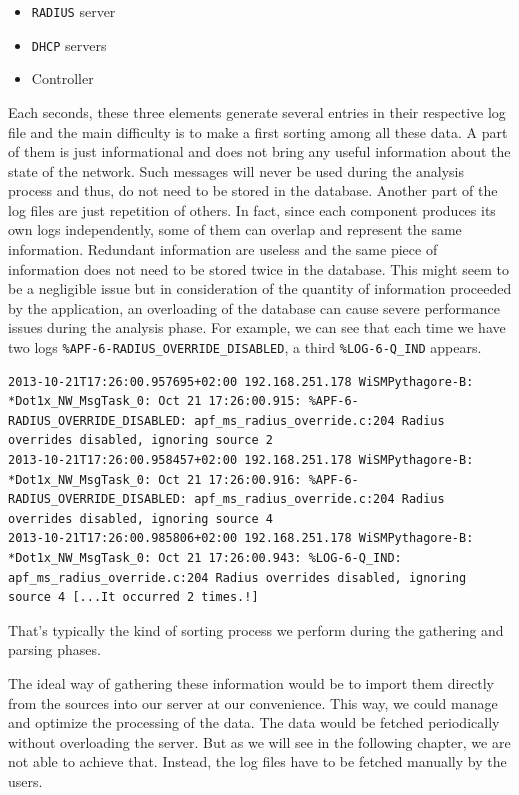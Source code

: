 \begin{itemize}
  \item \texttt{RADIUS} server
  \item \texttt{DHCP} servers
  \item Controller
\end{itemize}

Each seconds, these three elements generate several entries in their respective log file and the main difficulty is to make a first sorting among all these data. A part of them is just informational and does not bring any useful information about the state of the network. Such messages will never be used during the analysis process and thus, do not need to be stored in the database. Another part of the log files are just repetition of others. In fact, since each component produces its own logs independently, some of them can overlap and represent the same information. Redundant information are useless and the same piece of information does not need to be stored twice in the database. This might seem to be a negligible issue but in consideration of the quantity of information proceeded by the application, an overloading of the database can cause severe performance issues during the analysis phase. For example, we can see that each time we have two logs \texttt{\%APF-6-RADIUS\_OVERRIDE\_DISABLED}, a third \texttt{\%LOG-6-Q\_IND} appears.\\

\begin{lstlisting}[frame=single,breaklines=true,caption={Example of useless WiSM logs}]
2013-10-21T17:26:00.957695+02:00 192.168.251.178 WiSMPythagore-B: *Dot1x_NW_MsgTask_0: Oct 21 17:26:00.915: %APF-6-RADIUS_OVERRIDE_DISABLED: apf_ms_radius_override.c:204 Radius overrides disabled, ignoring source 2 
2013-10-21T17:26:00.958457+02:00 192.168.251.178 WiSMPythagore-B: *Dot1x_NW_MsgTask_0: Oct 21 17:26:00.916: %APF-6-RADIUS_OVERRIDE_DISABLED: apf_ms_radius_override.c:204 Radius overrides disabled, ignoring source 4 
2013-10-21T17:26:00.985806+02:00 192.168.251.178 WiSMPythagore-B: *Dot1x_NW_MsgTask_0: Oct 21 17:26:00.943: %LOG-6-Q_IND: apf_ms_radius_override.c:204 Radius overrides disabled, ignoring source 4 [...It occurred 2 times.!]
\end{lstlisting}

That's typically the kind of sorting process we perform during the gathering and parsing phases.

The ideal way of gathering these information would be to import them directly from the sources into our server at our convenience. This way, we could manage and optimize the processing of the data. The data would be fetched periodically without overloading the server. But as we will see in the following chapter, we are not able to achieve that. Instead, the log files have to be fetched manually by the users.


